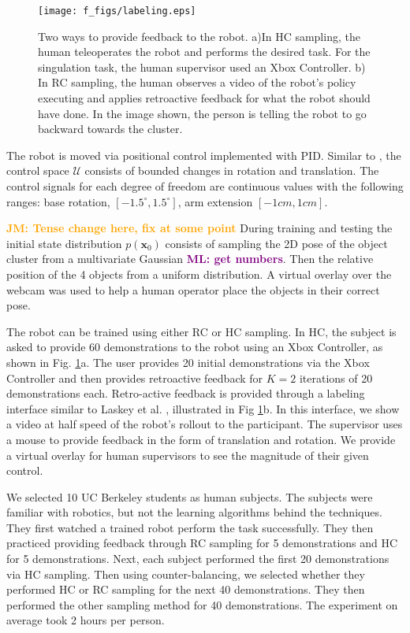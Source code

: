 \documentclass[10pt, conference]{ieeeconf}      %
\newcommand{\bx}{\mathbf{x}}
\newcommand{\mlnote}[1]{\ifthenelse{ \boolean{include-notes}}%
 {\textcolor{purple}{\textbf{ML: #1}}}{}}
\newcommand{\jmnote}[1]{\ifthenelse{ \boolean{include-notes}}%
 {\textcolor{orange}{\textbf{JM: #1}}}{}}
\begin{document}
\begin{figure}
\centering
\texttt{[image: f\_figs/labeling.eps]}
\caption{
    \footnotesize
Two ways to provide feedback to the robot. a)In HC sampling, the human teleoperates the robot and performs the desired task. For the singulation task, the human supervisor used an Xbox Controller. b) In RC sampling, the human observes a video of the robot's policy executing and applies retroactive feedback for what the robot should have done. In the image shown, the person is telling the robot to go backward towards the cluster.  }

\label{fig:labeling}
\end{figure}

The robot is moved via positional control implemented with PID. Similar to \cite{laskeyshiv}, the control space $\mathcal{U}$ consists of bounded changes in rotation and translation. The control signals for each degree of freedom are continuous values with the following ranges: base rotation, $[-1.5^\circ,1.5^\circ]$, arm extension $[-1cm,1cm]$.

\jmnote{Tense change here, fix at some point}
During training and testing the initial state distribution $p(\bx_0)$ consists of sampling the 2D pose of the object cluster from a multivariate Gaussian \mlnote{get numbers}. Then the relative position of the 4 objects from a uniform distribution.  A virtual overlay over the webcam was used to help a human operator place the objects in their correct pose. 

The robot can be trained using either RC or HC sampling. In HC, the subject is asked to provide 60 demonstrations to the robot using an Xbox Controller, as shown in Fig. \ref{fig:labeling}a. The user provides 20 initial demonstrations via the Xbox Controller and then provides retroactive feedback for $K=2$ iterations of 20 demonstrations each.
Retro-active feedback is provided through a labeling interface similar to Laskey et al. \cite{laskeyrobot}, illustrated in Fig \ref{fig:labeling}b. In this interface, we show a video at half speed of the robot's rollout to the participant. The supervisor uses a mouse to provide feedback in the form of translation and rotation. We provide a virtual overlay for human supervisors to see the magnitude of their given control. 

We selected 10 UC Berkeley students as human subjects. The subjects were familiar with robotics, but not the learning algorithms behind the techniques. They first watched a trained robot perform the task successfully.  They then practiced providing feedback through RC sampling for 5 demonstrations and HC for 5 demonstrations. Next, each subject performed the first 20 demonstrations via HC sampling. Then using counter-balancing, we selected whether they performed HC or RC sampling for the next 40 demonstrations. They then performed the other sampling method for 40 demonstrations. The experiment on average took 2 hours per person. 
\end{document}
